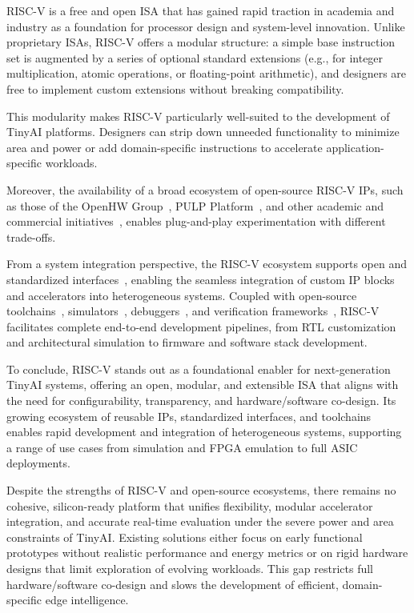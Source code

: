         RISC-V is a free and open ISA that has gained rapid traction in academia and industry as a foundation for processor design and system-level innovation. Unlike proprietary ISAs, RISC-V offers a modular structure: a simple base instruction set is augmented by a series of optional standard extensions (e.g., for integer multiplication, atomic operations, or floating-point arithmetic), and designers are free to implement custom extensions without breaking compatibility.
        
        This modularity makes RISC-V particularly well-suited to the development of TinyAI platforms. Designers can strip down unneeded functionality to minimize area and power or add domain-specific instructions to accelerate application-specific workloads.
        
        Moreover, the availability of a broad ecosystem of open-source RISC-V IPs, such as those of the OpenHW Group~\cite{openhw}, PULP Platform~\cite{pulp}, and other academic and commercial initiatives~\cite{opentitan}, enables plug-and-play experimentation with different trade-offs.
        
        From a system integration perspective, the RISC-V ecosystem supports open and standardized interfaces~\cite{xif}, enabling the seamless integration of custom IP blocks and accelerators into heterogeneous systems. Coupled with open-source toolchains~\cite{riscv_toolchain}, simulators~\cite{verilator}, debuggers~\cite{riscv_toolchain}, and verification frameworks~\cite{symbiyosys}, RISC-V facilitates complete end-to-end development pipelines, from RTL customization and architectural simulation to firmware and software stack development.

        To conclude, RISC-V stands out as a foundational enabler for next-generation TinyAI systems, offering an open, modular, and extensible ISA that aligns with the need for configurability, transparency, and hardware/software co-design. Its growing ecosystem of reusable IPs, standardized interfaces, and toolchains enables rapid development and integration of heterogeneous systems, supporting a range of use cases from simulation and FPGA emulation to full ASIC deployments. 

        Despite the strengths of RISC-V and open-source ecosystems, there remains no cohesive, silicon-ready platform that unifies flexibility, modular accelerator integration, and accurate real-time evaluation under the severe power and area constraints of TinyAI. Existing solutions either focus on early functional prototypes without realistic performance and energy metrics or on rigid hardware designs that limit exploration of evolving workloads. This gap restricts full hardware/software co-design and slows the development of efficient, domain-specific edge intelligence.
        
